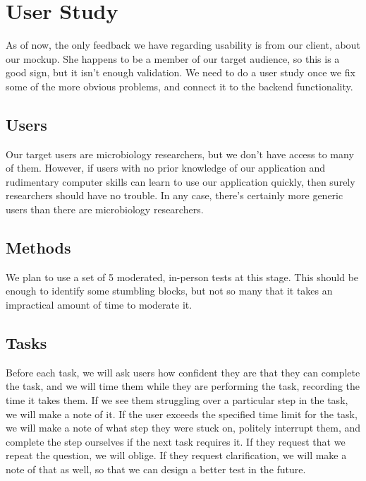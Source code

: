 \documentclass[letterpaper,10pt, onecolumn]{IEEEtran}
\begin{document}
\inputminted{python}{../../code/FaceView/fvParser.py}

\section*{User Study}

As of now, the only feedback we have regarding usability is from our client, about our mockup. She happens to be a member of our target audience, so this is a good sign, but it isn't enough validation. We need to do a user study once we fix some of the more obvious problems, and connect it to the backend functionality.

\subsection*{Users}

Our target users are microbiology researchers, but we don't have access to many of them. However, if users with no prior knowledge of our application and rudimentary computer skills can learn to use our application quickly, then surely researchers should have no trouble. In any case, there's certainly more generic users than there are microbiology researchers.

\subsection*{Methods}

We plan to use a set of 5 moderated, in-person tests at this stage. This should be enough to identify some stumbling blocks, but not so many that it takes an impractical amount of time to moderate it.

\subsection*{Tasks}

Before each task, we will ask users how confident they are that they can complete the task, and we will time them while they are performing the task, recording the time it takes them. If we see them struggling over a particular step in the task, we will make a note of it. If the user exceeds the specified time limit for the task, we will make a note of what step they were stuck on, politely interrupt them, and complete the step ourselves if the next task requires it. If they request that we repeat the question, we will oblige. If they request clarification, we will make a note of that as well, so that we can design a better test in the future.
\end{document}
